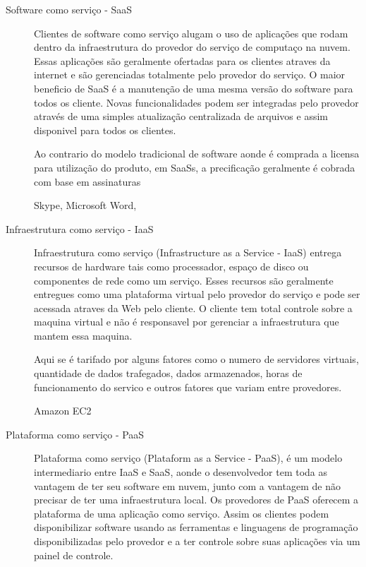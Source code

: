 	
		\begin{description}
		\item [Software como serviço - SaaS]
		Clientes de software como serviço alugam o uso de aplicações que rodam dentro da infraestrutura do provedor do serviço de computaço na nuvem. Essas aplicações são geralmente ofertadas para os clientes atraves da internet e são gerenciadas totalmente pelo provedor do serviço. O maior beneficio de SaaS é a manutenção de uma mesma versão do software para todos os cliente. Novas funcionalidades podem ser integradas pelo provedor através de uma simples atualização centralizada de arquivos e assim disponivel para todos os clientes.

		Ao contrario do modelo tradicional de software aonde é comprada a licensa para utilização do produto, em SaaSs, a precificação geralmente é cobrada com base em assinaturas


		Skype, Microsoft Word, 

		\item [Infraestrutura como serviço - IaaS]
		Infraestrutura como serviço (Infrastructure as a Service - IaaS) entrega recursos de hardware tais como processador, espaço de disco ou componentes de rede como um serviço. Esses recursos são geralmente entregues como uma plataforma virtual pelo provedor do serviço e pode ser acessada atraves da Web pelo cliente. O cliente tem total controle sobre a maquina virtual e não é responsavel por gerenciar a infraestrutura que mantem essa maquina.
	
		Aqui se é tarifado por alguns fatores como o numero de servidores virtuais, quantidade de dados trafegados, dados armazenados, horas de funcionamento do servico e outros fatores que variam entre provedores.

		Amazon EC2
	

		\item[Plataforma como serviço - PaaS]
		Plataforma como serviço (Plataform as a Service - PaaS), é um modelo intermediario entre IaaS e SaaS, aonde o desenvolvedor tem toda as vantagem de ter seu software em nuvem, junto com a vantagem de não precisar de ter uma infraestrutura local. Os provedores de PaaS oferecem a plataforma de uma aplicação como serviço. Assim os clientes podem disponibilizar software usando as ferramentas e linguagens de programação disponibilizadas pelo provedor e a ter controle sobre suas aplicações via um painel de controle.


\end{description}
